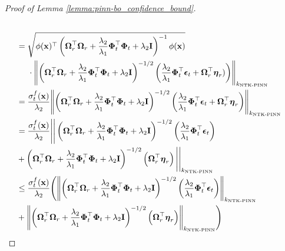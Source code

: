 \begin{proof}[Proof of Lemma \ref{lemma:pinn-bo_confidence_bound}]
\begin{align*}
                \\
                & = \sqrt{\phi(\mathbf{x})^\top\left(\boldsymbol{\Omega}_r^\top \boldsymbol{\Omega}_r + \frac{\lambda_2}{\lambda_1}\boldsymbol{\Phi}_t^\top\boldsymbol{\Phi}_t + \lambda_2\mathbf{I}\right)^{-1}\phi(\mathbf{x})} \notag \\
                & \;\;\;\;\;  \cdot \norm{\left(\boldsymbol{\Omega}_r^\top \boldsymbol{\Omega}_r + \frac{\lambda_2}{\lambda_1}\boldsymbol{\Phi}_t^\top\boldsymbol{\Phi}_t + \lambda_2\mathbf{I}\right)^{-1/2}\left(\frac{\lambda_2}{\lambda_1}\boldsymbol{\Phi}_t^\top \boldsymbol{\epsilon}_t + \boldsymbol{\Omega}_r^\top \boldsymbol{\eta}_r) \right)}_{k_\textup{NTK-PINN}}
                \\
                &=\frac{\sigma_t^f(\mathbf{x})}{\lambda_2}\norm{\left(\boldsymbol{\Omega}_r^\top \boldsymbol{\Omega}_r + \frac{\lambda_2}{\lambda_1}\boldsymbol{\Phi}_t^\top\boldsymbol{\Phi}_t + \lambda_2\mathbf{I}\right)^{-1/2}\left(\frac{\lambda_2}{\lambda_1}\boldsymbol{\Phi}_t^\top \boldsymbol{\epsilon}_t + \boldsymbol{\Omega}_r^\top \boldsymbol{\eta}_r \right)}_{k_\textup{NTK-PINN}} 
                \\
                &=\frac{\sigma_t^f(\mathbf{x})}{\lambda_2} \Bigg\lvert \Bigg\lvert\left(\boldsymbol{\Omega}_r^\top \boldsymbol{\Omega}_r + \frac{\lambda_2}{\lambda_1}\boldsymbol{\Phi}_t^\top\boldsymbol{\Phi}_t + \lambda_2\mathbf{I}\right)^{-1/2}\left(\frac{\lambda_2}{\lambda_1}\boldsymbol{\Phi}_t^\top \boldsymbol{\epsilon}_t \right) \notag \\
                & + \left(\boldsymbol{\Omega}_r^\top \boldsymbol{\Omega}_r 
                + \frac{\lambda_2}{\lambda_1}\boldsymbol{\Phi}_t^\top\boldsymbol{\Phi}_t + \lambda_2\mathbf{I}\right)^{-1/2}\left( \boldsymbol{\Omega}_r^\top \boldsymbol{\eta}_r \right) \Bigg\rvert \Bigg\lvert_{k_\textup{NTK-PINN}} 
                \\
                & \le \frac{\sigma_t^f(\mathbf{x})}{\lambda_2} \Bigg( \norm{\left(\boldsymbol{\Omega}_r^\top \boldsymbol{\Omega}_r + \frac{\lambda_2}{\lambda_1}\boldsymbol{\Phi}_t^\top\boldsymbol{\Phi}_t + \lambda_2\mathbf{I}\right)^{-1/2}\left(\frac{\lambda_2}{\lambda_1}\boldsymbol{\Phi}_t^\top \boldsymbol{\epsilon}_t \right)}_{k_\textup{NTK-PINN}} \notag \\
                & + \norm{\left(\boldsymbol{\Omega}_r^\top \boldsymbol{\Omega}_r + \frac{\lambda_2}{\lambda_1}\boldsymbol{\Phi}_t^\top\boldsymbol{\Phi}_t + \lambda_2\mathbf{I}\right)^{-1/2}\left( \boldsymbol{\Omega}_r^\top \boldsymbol{\eta}_r \right)}_{k_\textup{NTK-PINN}} \Bigg)

\end{align*}
\end{proof}
